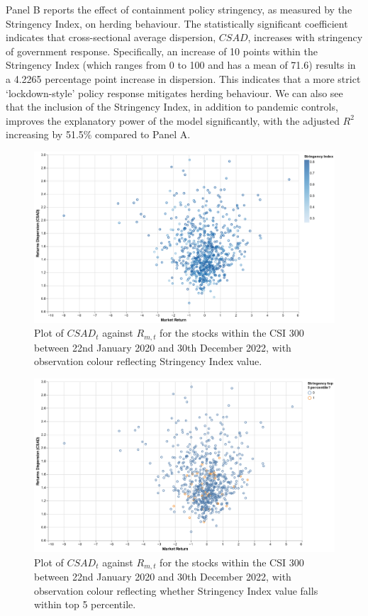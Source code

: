 \documentclass[12pt]{article}
\numberwithin{table}{section}   %
\begin{document}
Panel B reports the effect of containment policy stringency, as measured by the Stringency Index, on herding behaviour. The statistically significant coefficient indicates that cross-sectional average dispersion, $CSAD$, increases with stringency of government response. Specifically, an increase of 10 points within the Stringency Index (which ranges from 0 to 100 and has a mean of 71.6) results in a 4.2265 percentage point increase in dispersion. This indicates that a more strict ‘lockdown-style’ policy response mitigates herding behaviour. We can also see that the inclusion of the Stringency Index, in addition to pandemic controls, improves the explanatory power of the model significantly, with the adjusted $R^2$ increasing by 51.5\% compared to Panel A.

\begin{figure}
    \centering
    \includegraphics[scale=0.25]{./graphics/dispersions_returns_stringency_plot.png}
    \caption{Plot of $CSAD_t$ against $R_{m,t}$ for the stocks within the CSI 300 between 22nd January 2020 and 30th December 2022, with observation colour reflecting Stringency Index value.}
    \label{fig:stringency_dispersion}
\end{figure}

\begin{figure}
    \centering
    \includegraphics[scale=0.25]{./graphics/dispersions_returns_d5_plot.png}
    \caption{Plot of $CSAD_t$ against $R_{m,t}$ for the stocks within the CSI 300 between 22nd January 2020 and 30th December 2022, with observation colour reflecting whether Stringency Index value falls within top 5 percentile.}
    \label{fig:s_5_dispersion}
\end{figure}
\end{document}
